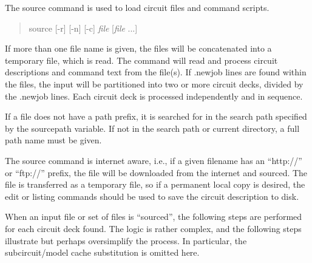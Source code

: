
The {\cb source} command is used to load circuit files and command
scripts.
\begin{quote}\vt
source [{\vt -r}] [{\vt -n}] [{\vt -c}] {\it file} [{\it file} ...]
\end{quote}
If more than one file name is given, the files will be concatenated
into a temporary file, which is read.  The command will read and
process circuit descriptions and command text from the file(s).  If
{\vt .newjob} lines are found within the files, the input will be
partitioned into two or more circuit decks, divided by the {\vt
.newjob} lines.  Each circuit deck is processed independently and in
sequence.

If a file does not have a path prefix, it is searched for in the
search path specified by the {\et sourcepath} variable.  If not in the
search path or current directory, a full path name must be given.

The {\cb source} command is internet aware, i.e., if a given filename
has an ``{\vt http://}'' or ``{\vt ftp://}'' prefix, the file will be
downloaded from the internet and sourced.  The file is transferred as
a temporary file, so if a permanent local copy is desired, the {\cb
edit} or {\cb listing} commands should be used to save the circuit
description to disk. 

When an input file or set of files is ``sourced'', the following steps
are performed for each circuit deck found.  The logic is rather
complex, and the following steps illustrate but perhaps oversimplify
the process.  In particular, the subcircuit/model cache substitution
is omitted here.

